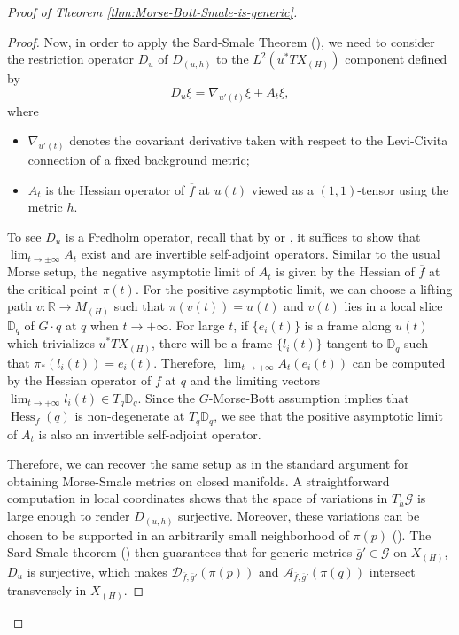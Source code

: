 \documentclass[11pt]{amsart}
\theoremstyle{definition}
\numberwithin{equation}{subsection}
\DeclareMathOperator{\Hess}{Hess}
\newcommand{\des}{\mathscr{D}}
\newcommand{\asc}{\mathscr{A}}
\begin{document}
\begin{proof}[Proof of Theorem \ref{thm:Morse-Bott-Smale-is-generic}]
\begin{proof}
   Now, in order to apply the Sard-Smale Theorem (\cite[Theorem 5.4]{hutchings2002lecture}), we need to consider the restriction operator $D_u$ of $D_{(u,h)}$ to the $L^2(u^*TX_{(H)})$ component defined by
   \[D_{u}\xi=\nabla_{u'(t)}\xi+A_{t}\xi,\] where 
   \begin{itemize}
       \item $\nabla_{u'(t)}$ denotes the covariant derivative taken with respect to the Levi-Civita connection of a fixed background metric;
       \item $A_{t}$ is the Hessian operator of $\overline{f}$ at $u(t)$ viewed as a $(1,1)$-tensor using the metric $h$.
   \end{itemize} To see $D_u$ is a Fredholm operator, recall that by \cite[Theorem 2.1]{RSspecflow} or \cite[Principle 5.6]{hutchings2002lecture} , it suffices to show that $\lim_{t\rightarrow\pm\infty} A_t$ exist and are invertible self-adjoint operators. Similar to the usual Morse setup, the negative asymptotic limit of $A_t$ is given by the Hessian of $\overline{f}$ at the critical point $\pi(t)$. For the positive asymptotic limit, we can choose a lifting path $v:\mathbb{R}\rightarrow M_{(H)}$ such that $\pi(v(t))=u(t)$ and $v(t)$ lies in a local slice $\mathbb{D}_q$ of $G\cdot q$ at $q$ when $t\rightarrow+\infty$. 
  For large $t$, if $\{e_i(t)\}$ is a frame along $u(t)$ which trivializes $u^*TX_{(H)}$, there will be a frame $\{l_i(t)\}$ tangent to $\mathbb{D}_q$ such that $\pi_*(l_i(t))=e_i(t)$. Therefore, $\lim_{t\rightarrow+\infty} A_t(e_i(t))$ can be computed by the Hessian operator of $f$ at $q$ and the limiting vectors $\lim_{t\rightarrow+\infty}l_i(t)\in T_q\mathbb{D}_q$. Since the $G$-Morse-Bott assumption implies that $\Hess_f(q)$ is non-degenerate at $T_q\mathbb{D}_q$, we see that the positive asymptotic limit of $A_t$ is also an invertible self-adjoint operator.  
  
  Therefore, we can recover the same setup as in the standard argument for obtaining Morse-Smale metrics on closed manifolds. A straightforward computation in local coordinates shows that the space of variations in $T_h\mathcal{G}$ is large enough to render $D_{(u,h)}$ surjective. Moreover, these variations can be chosen to be supported in an arbitrarily small neighborhood of $\pi(p)$ (\cite[Proposition 5.8, Step 2(a)]{hutchings2002lecture}). The Sard-Smale theorem (\cite[Theorem 5.4]{hutchings2002lecture}) then guarantees that for generic metrics $\overline{g}'\in \mathcal{G}$ on $X_{(H)}$, $D_u$ is surjective, which makes $\des_{\overline{f},\overline{g}'}(\pi(p))$ and $\asc_{\overline{f},\overline{g}'}(\pi(q))$ intersect transversely in $X_{(H)}$. 


\end{proof}
\end{proof}
\end{document}
